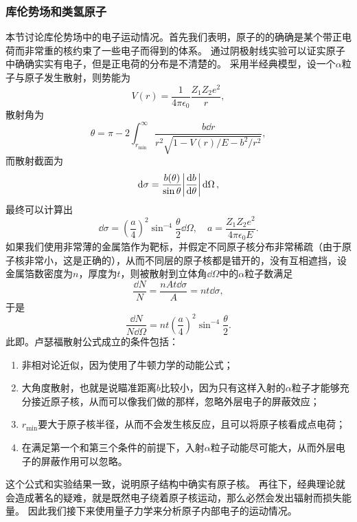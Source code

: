 \subsubsection{库伦势场和类氢原子}

本节讨论库伦势场中的电子运动情况。首先我们表明，原子的的确确是某个带正电荷而非常重的核约束了一些电子而得到的体系。
通过阴极射线实验可以证实原子中确确实实有电子，但是正电荷的分布是不清楚的。
采用半经典模型，设一个$\alpha$粒子与原子发生散射，则势能为
\begin{equation}
    V(r) = \frac{1}{4\pi \epsilon_0} \frac{Z_1 Z_2 e^2}{r}, 
\end{equation}
散射角为
\[
    \theta = \pi - 2 \int_{r_\text{min}}^\infty \frac{b \dd{r}}{r^2 \sqrt{1 - V(r)/E - b^2/r^2}},  
\]
而散射截面为
\[
    \dd{\sigma} = \frac{b(\theta)}{\sin \theta} \abs{\dv{b}{\theta}} \dd{\Omega},
\]
最终可以计算出
\begin{equation}
    \dd{\sigma} = \left(\frac{a}{4}\right)^2 \sin^{-4}\frac{\theta}{2} \dd{\Omega}, \quad a = \frac{Z_1 Z_2 e^2}{4\pi \epsilon_0 E}.    
\end{equation}
如果我们使用非常薄的金属箔作为靶标，并假定不同原子核分布非常稀疏（由于原子核非常小，这是正确的），从而不同层的原子核都是错开的，没有互相遮挡，设金属箔数密度为$n$，厚度为$t$，则被散射到立体角$\dd{\Omega}$中的$\alpha$粒子数满足
\[
    \frac{\dd{N}}{N} = \frac{n A t \dd{\sigma}}{A} = nt \dd{\sigma},
\]
于是
\begin{equation}
    \frac{\dd{N}}{N \dd{\Omega}} = n t \left(\frac{a}{4}\right)^2 \sin^{-4}\frac{\theta}{2}.
\end{equation}
此即。卢瑟福散射公式成立的条件包括：
\begin{enumerate}
    \item 非相对论近似，因为使用了牛顿力学的动能公式；
    \item 大角度散射，也就是说瞄准距离$b$比较小，因为只有这样入射的$\alpha$粒子才能够充分接近原子核，从而可以像我们做的那样，忽略外层电子的屏蔽效应；
    \item $r_\text{min}$要大于原子核半径，从而不会发生核反应，且可以将原子核看成点电荷；
    \item 在满足第一个和第三个条件的前提下，入射$\alpha$粒子动能尽可能大，从而外层电子的屏蔽作用可以忽略。
\end{enumerate}
这个公式和实验结果一致，说明原子结构中确实有原子核。
再往下，经典理论就会造成著名的疑难，就是既然电子绕着原子核运动，那么必然会发出辐射而损失能量。
因此我们接下来使用量子力学来分析原子内部电子的运动情况。

